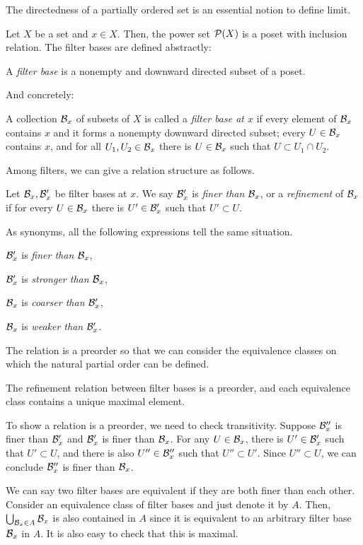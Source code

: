 \documentclass{../crs}
\begin{document}
The directedness of a partially ordered set is an essential notion to define limit.

Let $X$ be a set and $x\in X$.
Then, the power set $\mathcal{P}(X)$ is a poset with inclusion relation.
The filter bases are defined abstractly:
\begin{defn}
A \emph{filter base} is a nonempty and downward directed subset of a poset.
\end{defn}
And concretely:
\begin{defn}
A collection $\mathcal{B}_x$ of subsets of $X$ is called a \emph{filter base at $x$} if every element of $\mathcal{B}_x$ contains $x$ and it forms a nonempty downward directed subset; every $U\in\mathcal{B}_x$ contains $x$, and for all $U_1,U_2\in\mathcal{B}_x$ there is $U\in\mathcal{B}_x$ such that $U\subset U_1\cap U_2$.
\end{defn}

Among filters, we can give a relation structure as follows.

\begin{defn}
Let $\mathcal{B}_x,\mathcal{B}'_x$ be filter bases at $x$.
We say $\mathcal{B}'_x$ is \emph{finer than} $\mathcal{B}_x$, or a \emph{refinement} of $\mathcal{B}_x$ if for every $U\in\mathcal{B}_x$ there is $U'\in\mathcal{B}'_x$ such that $U'\subset U$.
\end{defn}

As synonyms, all the following expressions tell the same situation.
\begin{cond}
\item $\mathcal{B}'_x$ is \emph{finer than} $\mathcal{B}_x$,
\item $\mathcal{B}'_x$ is \emph{stronger than} $\mathcal{B}_x$,
\item $\mathcal{B}_x$ is \emph{coarser than} $\mathcal{B}'_x$,
\item $\mathcal{B}_x$ is \emph{weaker than} $\mathcal{B}'_x$.
\end{cond}
The relation is a preorder so that we can consider the equivalence classes on which the natural partial order can be defined.

\begin{prop}
The refinement relation between filter bases is a preorder, and each equivalence class contains a unique maximal element.
\end{prop}
\begin{pf}
To show a relation is a preorder, we need to check transitivity.
Suppose $\mathcal{B}''_x$ is finer than $\mathcal{B}'_x$ and $\mathcal{B}'_x$ is finer than $\mathcal{B}_x$.
For any $U\in\mathcal{B}_x$, there is $U'\in\mathcal{B}'_x$ such that $U'\subset U$, and there is also $U''\in\mathcal{B}''_x$ such that $U''\subset U'$.
Since $U''\subset U$, we can conclude $\mathcal{B}''_x$ is finer than $\mathcal{B}_x$.

We can say two filter bases are equivalent if they are both finer than each other.
Consider an equivalence class of filter bases and just denote it by $A$.
Then, $\bigcup_{\mathcal{B}_x\in A}\mathcal{B}_x$ is also contained in $A$ since it is equivalent to an arbitrary filter base $\mathcal{B}_x$ in $A$.
It is also easy to check that this is maximal.
\end{pf}
\end{document}
